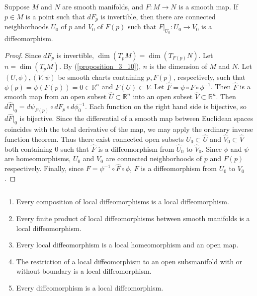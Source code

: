 \begin{customthm}{4.5}
  Suppose $M$ and $N$ are smooth manifolds, and $F: M \rightarrow N$ is a smooth map.
  If $p \in M$ is a point such that $dF_p$ is invertible, then there are connected neighborhoods $U_0$ of $p$ and $V_0$ of $F(p)$ such that $F\vert_{U_0}: U_0 \rightarrow V_0$ is a diffeomorphism.
\end{customthm}

\begin{proof}
  Since $dF_p$ is invertible, $\dim(T_pM) = \dim(T_{F(p)}N)$.
  Let $n = \dim(T_pM)$.
  By (\ref{proposition_3_10}), $n$ is the dimension of $M$ and $N$.
  Let $(U, \phi), (V, \psi)$ be smooth charts containing $p, F(p)$, respectively, such that $\phi(p) = \psi(F(p)) = 0 \in \mathbb{R}^n$ and $F(U) \subset V$.
  Let $\hat{F} = \psi \circ F \circ \phi^{-1}$.
  Then $\hat{F}$ is a smooth map from an open subset $\hat{U} \subset \mathbb{R}^n$ into an open subset $\hat{V} \subset \mathbb{R}^n$.
  Then $d\hat{F}\vert_0 = d\psi_{F(p)} \circ dF_p \circ d\phi^{-1}_0$.
  Each function on the right hand side is bijective, so $d\hat{F}\vert_0$ is bijective.
  Since the differential of a smooth map between Euclidean spaces coincides with the total derivative of the map, we may apply the ordinary inverse function theorem.
  Thus there exist connected open subsets $\hat{U}_0 \subset \hat{U}$ and $\hat{V}_0 \subset \hat{V}$ both containing 0 such that $\hat{F}$ is a diffeomorphism from $\hat{U}_0$ to $\hat{V}_0$.
  Since $\phi$ and $\psi$ are homeomorphisms, $U_0$ and $V_0$ are connected neighborhoods of $p$ and $F(p)$ respectively.
  Finally, since $F = \psi^{-1} \circ \hat{F} \circ \phi$, $F$ is a diffeomorphism from $U_0$ to $V_0$.
\end{proof}

\begin{customthm}{4.6}
  $ $
  \begin{enumerate}[label=(\alph*)]
    \item 
      Every composition of local diffeomorphisms is a local diffeomorphism.
    \item
      Every finite product of local diffeomorphisms between smooth manifolds is a local diffeomorphism.
    \item
      Every local diffeomorphism is a local homeomorphism and an open map.
    \item
      The restriction of a local diffeomorphism to an open subsmanifold with or without boundary is a local diffeomorphism.
    \item
      Every diffeomorphism is a local diffeomorphism.
  \end{enumerate}
\end{customthm}

